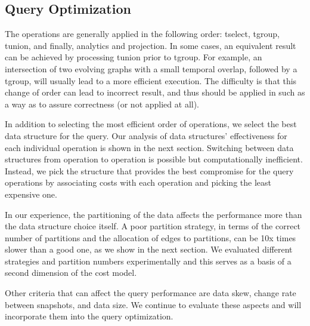 \subsection{Query Optimization}
\label{sec:sys:optimization}

The operations are generally applied in the following order: tselect,
tgroup, tunion, and finally, analytics and projection.  In some cases,
an equivalent result can be achieved by processing tunion prior to
tgroup.  For example, an intersection of two evolving graphs with a
small temporal overlap, followed by a tgroup, will usually lead to a
more efficient execution.    The difficulty is that this change of order can lead
to incorrect result, and thus should be applied in such as a way as to
assure correctness (or not applied at all).

In addition to selecting the most efficient order of operations, we
select the best data structure for the query.  Our analysis of data
structures' effectiveness for each individual operation is shown in
the next section.  Switching between data structures from operation to
operation is possible but computationally inefficient.  Instead, we
pick the structure that provides the best compromise for the query
operations by associating costs with each operation and picking the
least expensive one.  

In our experience, the partitioning of the data affects the
performance more than the data structure choice itself.  A poor
partition strategy, in terms of the correct number of partitions and
the allocation of edges to partitions, can be 10x times slower than a
good one, as we show in the next section.  We evaluated different
strategies and partition numbers experimentally and this serves as a
basis of a second dimension of the cost model.

Other criteria that can affect the query performance are data skew,
change rate between snapshots, and data size.  We continue to evaluate
these aspects and will incorporate them into the query optimization.
